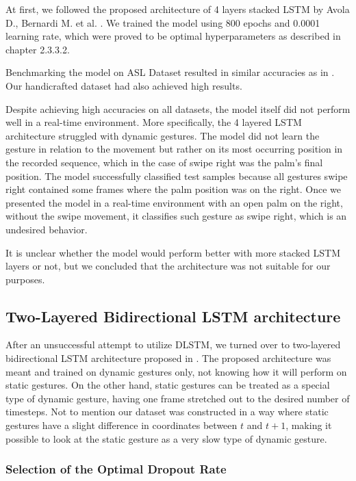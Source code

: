 At first, we followed the proposed architecture of 4 layers stacked LSTM by Avola D., Bernardi M. et al. \cite{avola}. We trained the model using 800 epochs and 0.0001 learning rate, which were proved to be optimal hyperparameters as described in chapter 2.3.3.2.

Benchmarking the model on ASL Dataset resulted in similar accuracies as in \cite{avola}. Our handicrafted dataset had also achieved high results.

Despite achieving high accuracies on all datasets, the model itself did not perform well in a real-time environment. More specifically, the 4 layered LSTM architecture struggled with dynamic gestures. The model did not learn the gesture in relation to the movement but rather on its most occurring position in the recorded sequence, which in the case of swipe right was the palm's final position. The model successfully classified test samples because all gestures swipe right contained some frames where the palm position was on the right. Once we presented the model in a real-time environment with an open palm on the right, without the swipe movement, it classifies such gesture as swipe right, which is an undesired behavior. 

It is unclear whether the model would perform better with more stacked LSTM layers or not, but we concluded that the architecture was not suitable for our purposes. 

\subsection{Two-Layered Bidirectional LSTM architecture}

After an unsuccessful attempt to utilize DLSTM, we turned over to two-layered bidirectional LSTM architecture proposed in \cite{bidirect_dynam}. The proposed architecture was meant and trained on dynamic gestures only, not knowing how it will perform on static gestures. On the other hand, static gestures can be treated as a special type of dynamic gesture, having one frame stretched out to the desired number of timesteps. Not to mention our dataset was constructed in a way where static gestures have a slight difference in coordinates between $t$ and $t+1$, making it possible to look at the static gesture as a very slow type of dynamic gesture.

\subsubsection{Selection of the Optimal Dropout Rate}

